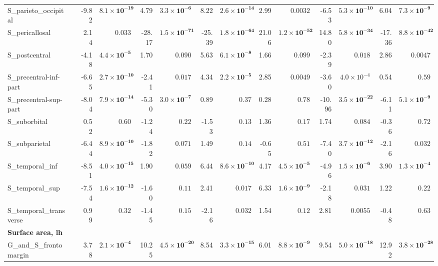 {\begin{longtable}{llrrrrrrrrrrrr}
S\_parieto\_occipital &  & -9.82 & $\mathbf{8.1{\times}10^{-19}}$ & 4.79 & $\mathbf{3.3{\times}10^{-6}}$ & 8.22 & $\mathbf{2.6{\times}10^{-14}}$ & 2.99 & $0.0032$ & -6.53 & $\mathbf{5.3{\times}10^{-10}}$ & 6.04 & $\mathbf{7.3{\times}10^{-9}}$ \\
S\_pericallosal &  & 2.14 & $0.033$ & -28.17 & $\mathbf{1.5{\times}10^{-71}}$ & -25.39 & $\mathbf{1.8{\times}10^{-64}}$ & 21.06 & $\mathbf{1.2{\times}10^{-52}}$ & 14.80 & $\mathbf{5.8{\times}10^{-34}}$ & -17.36 & $\mathbf{8.8{\times}10^{-42}}$ \\
S\_postcentral &  & -4.18 & $\mathbf{4.4{\times}10^{-5}}$ & 1.70 & $0.090$ & 5.63 & $\mathbf{6.1{\times}10^{-8}}$ & 1.66 & $0.099$ & -2.39 & $0.018$ & 2.86 & $0.0047$ \\
S\_precentral-inf-part &  & -6.65 & $\mathbf{2.7{\times}10^{-10}}$ & -2.41 & $0.017$ & 4.34 & $\mathbf{2.2{\times}10^{-5}}$ & 2.85 & $0.0049$ & -3.60 & $4.0{\times}10^{-4}$ & 0.54 & $0.59$ \\
S\_precentral-sup-part &  & -8.04 & $\mathbf{7.9{\times}10^{-14}}$ & -5.30 & $\mathbf{3.0{\times}10^{-7}}$ & 0.89 & $0.37$ & 0.28 & $0.78$ & -10.96 & $\mathbf{3.5{\times}10^{-22}}$ & -6.11 & $\mathbf{5.1{\times}10^{-9}}$ \\
S\_suborbital &  & 0.52 & $0.60$ & -1.24 & $0.22$ & -1.53 & $0.13$ & 1.36 & $0.17$ & 1.74 & $0.084$ & -0.36 & $0.72$ \\
S\_subparietal &  & -6.44 & $\mathbf{8.9{\times}10^{-10}}$ & -1.82 & $0.071$ & 1.49 & $0.14$ & -0.65 & $0.51$ & -7.40 & $\mathbf{3.7{\times}10^{-12}}$ & -2.16 & $0.032$ \\
S\_temporal\_inf &  & -8.51 & $\mathbf{4.0{\times}10^{-15}}$ & 1.90 & $0.059$ & 6.44 & $\mathbf{8.6{\times}10^{-10}}$ & 4.17 & $\mathbf{4.5{\times}10^{-5}}$ & -4.96 & $\mathbf{1.5{\times}10^{-6}}$ & 3.90 & $\mathbf{1.3{\times}10^{-4}}$ \\
S\_temporal\_sup &  & -7.54 & $\mathbf{1.6{\times}10^{-12}}$ & -1.60 & $0.11$ & 2.41 & $0.017$ & 6.33 & $\mathbf{1.6{\times}10^{-9}}$ & -2.18 & $0.031$ & 1.22 & $0.22$ \\
S\_temporal\_transverse &  & 0.99 & $0.32$ & -1.45 & $0.15$ & -2.16 & $0.032$ & 1.54 & $0.12$ & 2.81 & $0.0055$ & -0.48 & $0.63$ \\
\midrule\multicolumn{14}{l}{\textbf{Surface area, lh}} \\
G\_and\_S\_frontomargin &  & 3.78 & $\mathbf{2.1{\times}10^{-4}}$ & 10.25 & $\mathbf{4.5{\times}10^{-20}}$ & 8.54 & $\mathbf{3.3{\times}10^{-15}}$ & 6.01 & $\mathbf{8.8{\times}10^{-9}}$ & 9.54 & $\mathbf{5.0{\times}10^{-18}}$ & 12.92 & $\mathbf{3.8{\times}10^{-28}}$ \\

\end{longtable}}
